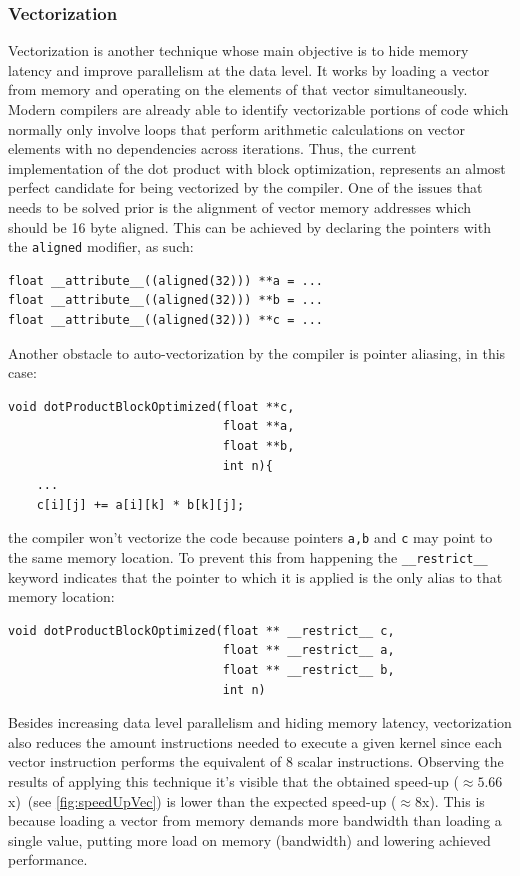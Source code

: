 \documentclass{article}
\begin{document}
\subsubsection{Vectorization}
Vectorization is another technique whose main objective is to hide memory latency and improve parallelism at the data level. It works by loading a vector from memory 
and operating on the elements of that vector simultaneously. Modern compilers are already able to identify vectorizable portions of code which normally only involve
loops that perform arithmetic calculations on vector elements with no dependencies across iterations. 
Thus, the current implementation of the dot product with block optimization, represents an almost perfect candidate for being vectorized by the compiler. One of the 
issues that needs to be solved prior is the alignment of vector memory addresses which should be 16 byte aligned. This can be achieved by declaring the pointers with the \texttt{aligned} modifier, as such:
\begin{Verbatim}[fontsize=\small]
float __attribute__((aligned(32))) **a = ...
float __attribute__((aligned(32))) **b = ...
float __attribute__((aligned(32))) **c = ...
\end{Verbatim}
Another obstacle to auto-vectorization by the compiler is pointer aliasing, in this case:
\begin{Verbatim}[fontsize=\small]
void dotProductBlockOptimized(float **c, 
                              float **a, 
                              float **b, 
                              int n){
    ...
    c[i][j] += a[i][k] * b[k][j]; 
\end{Verbatim}
the compiler won't vectorize the code because pointers \texttt{a,b} and \texttt{c} may point to the same memory location. To prevent this from happening the 
\texttt{\_\_restrict\_\_} keyword indicates that the pointer to which it is applied is the only alias to that memory location:
\begin{Verbatim}[fontsize=\small]
void dotProductBlockOptimized(float ** __restrict__ c, 
                              float ** __restrict__ a, 
                              float ** __restrict__ b, 
                              int n)
\end{Verbatim}
Besides increasing data level parallelism and hiding memory latency, vectorization also reduces the amount instructions needed to execute a given kernel since
each vector instruction performs the equivalent of 8 scalar instructions. 
Observing the results of applying this technique it's visible that the obtained speed-up ($\approx 5.66$x)~(see \ref{fig:speedUpVec}) is lower than the expected speed-up ($\approx 8$x). 
This is because loading a vector from memory demands more bandwidth than loading a single value, putting more load on memory (bandwidth) and lowering achieved 
performance. 
\end{document}
